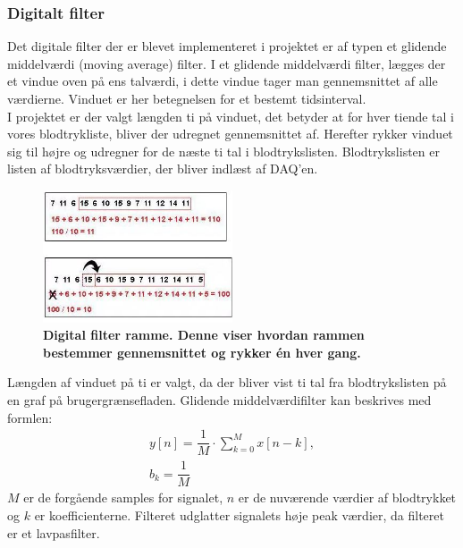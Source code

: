 \subsubsection{Digitalt filter}
Det digitale filter der er blevet implementeret i projektet er af typen et glidende middelværdi (moving average) filter. I et glidende middelværdi filter, lægges der et vindue oven på ens talværdi, i dette vindue tager man gennemsnittet af alle værdierne. \cite{digifilter} Vinduet er her betegnelsen for et bestemt tidsinterval. \\
I projektet er der valgt længden ti på vinduet, det betyder at for hver tiende tal i vores blodtrykliste, bliver der udregnet gennemsnittet af. Herefter rykker vinduet sig til højre og udregner for de næste ti tal i blodtrykslisten. Blodtrykslisten er listen af blodtryksværdier, der bliver indlæst af DAQ’en. 
\begin{figure}[H]
\includegraphics[width =0.5\textwidth , center]{billeder/RammeDigi}
\caption{\textbf{Digital filter ramme. Denne viser hvordan rammen bestemmer gennemsnittet og rykker én hver gang.}}
\end{figure}
Længden af vinduet på ti er valgt, da der bliver vist ti tal fra blodtrykslisten på en graf på brugergrænsefladen. 
Glidende middelværdifilter kan beskrives med formlen:
\begin{align}
y\left[n\right] = \dfrac{1}{M}\cdot \sum_{k=0}^{M}x\left[n-k\right],\\ b_{k}=\dfrac{1}{M}
\end{align}
$M$ er de forgående samples for signalet, $n$ er de nuværende værdier af blodtrykket og $k$ er koefficienterne. 
Filteret udglatter signalets høje peak værdier, da filteret er et lavpasfilter.
